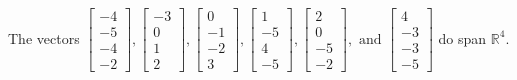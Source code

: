 \begin{exercise}
\begin{exerciseStatement}
  \end{exerciseStatement}
  \begin{exerciseAnswer}
   The vectors \(\left[\begin{array}{r}
-4 \\
-5 \\
-4 \\
-2
\end{array}\right] , \left[\begin{array}{r}
-3 \\
0 \\
1 \\
2
\end{array}\right] , \left[\begin{array}{r}
0 \\
-1 \\
-2 \\
3
\end{array}\right] , \left[\begin{array}{r}
1 \\
-5 \\
4 \\
-5
\end{array}\right] , \left[\begin{array}{r}
2 \\
0 \\
-5 \\
-2
\end{array}\right] , \text{ and } \left[\begin{array}{r}
4 \\
-3 \\
-3 \\
-5
\end{array}\right]\) 
  	 do  
	span \(\mathbb{R}^4\).
  


  \end{exerciseAnswer}
\end{exercise}